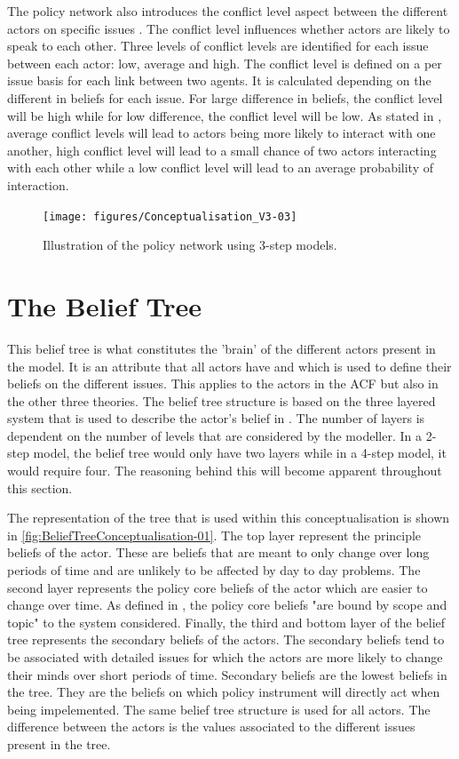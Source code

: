 The policy network also introduces the conflict level aspect between the different actors on specific issues \citep{jenkins2014advocacy}. The conflict level influences whether actors are likely to speak to each other. Three levels of conflict levels are identified for each issue between each actor: low, average and high. The conflict level is defined on a per issue basis for each link between two agents. It is calculated depending on the different in beliefs for each issue. For large difference in beliefs, the conflict level will be high while for low difference, the conflict level will be low. As stated in \cite{jenkins2014advocacy}, average conflict levels will lead to actors being more likely to interact with one another, high conflict level will lead to a small chance of two actors interacting with each other while a low conflict level will lead to an average probability of interaction.

\begin{figure}
\centering
\texttt{[image: figures/Conceptualisation\_V3-03]}
\caption{Illustration of the policy network using 3-step models.}
\label{fig:Conceptualisation_V3-03}
\end{figure}

%
\section{The Belief Tree}
\label{sec:beliefTree}

This belief tree is what constitutes the 'brain' of the different actors present in the model. It is an attribute that all actors have and which is used to define their beliefs on the different issues. This applies to the actors in the ACF but also in the other three theories. The belief tree structure is based on the three layered system that is used to describe the actor's belief in \cite{jenkins2014advocacy}. The number of layers is dependent on the number of levels that are considered by the modeller. In a 2-step model, the belief tree would only have two layers while in a 4-step model, it would require four. The reasoning behind this will become apparent throughout this section.

The representation of the tree that is used within this conceptualisation is shown in \autoref{fig:BeliefTreeConceptualisation-01}. The top layer represent the principle beliefs of the actor. These are beliefs that are meant to only change over long periods of time and are unlikely to be affected by day to day problems. The second layer represents the policy core beliefs of the actor which are easier to change over time. As defined in \cite{jenkins2014advocacy}, the policy core beliefs "are bound by scope and topic" to the system considered. Finally, the third and bottom layer of the belief tree represents the secondary beliefs of the actors. The secondary beliefs tend to be associated with detailed issues for which the actors are more likely to change their minds over short periods of time. Secondary beliefs are the lowest beliefs in the tree. They are the beliefs on which policy instrument will directly act when being impelemented. The same belief tree structure is used for all actors. The difference between the actors is the values associated to the different issues present in the tree.

